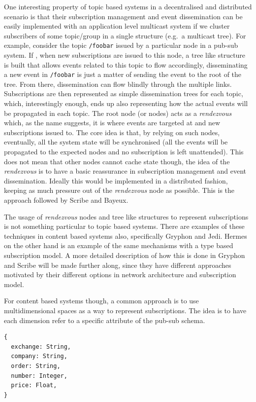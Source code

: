One interesting property of topic based systems in a decentralised and
distributed scenario is that their subscription management and event
dissemination can be easily implemented with an application level
multicast system if we cluster subscribers of some topic/group in a
single structure (e.g.~a multicast tree). For example, consider the
topic \texttt{/foobar} issued by a particular node in a pub-sub system.
If , when new subscriptions are issued to this node, a tree like
structure is built that allows events related to this topic to flow
accordingly, disseminating a new event in \texttt{/foobar} is just a
matter of sending the event to the root of the tree. From there,
dissemination can flow blindly through the multiple links. Subscriptions
are then represented as simple dissemination trees for each topic,
which, interestingly enough, ends up also representing how the actual
events will be propagated in each topic. The root node (or nodes) acts
as a \emph{rendezvous} which, as the name suggests, it is where events
are targeted at and new subscriptions issued to. The core idea is that,
by relying on such nodes, eventually, all the system state will be
synchronised (all the events will be propagated to the expected nodes
and no subscription is left unattended). This does not mean that other
nodes cannot cache state though, the idea of the \emph{rendezvous} is to
have a basic reassurance in subscription management and event
dissemination. Ideally this would be implemented in a distributed
fashion, keeping as much pressure out of the \emph{rendezvous} node as
possible. This is the approach followed by Scribe and Bayeux.

The usage of \emph{rendezvous} nodes and tree like structures to
represent subscriptions is not something particular to topic based
systems. There are examples of these techniques in content based systems
also, specifically Gryphon and Jedi. Hermes on the other hand is
an example of the same mechanisms with a type based subscription model.
A more detailed description of how this is done in Gryphon and Scribe
will be made further along, since they have different approaches
motivated by their different options in network architecture and
subscription model.

For content based systems though, a common approach is to use
multidimensional spaces as a way to represent subscriptions. The idea is
to have each dimension refer to a specific attribute of the pub-sub
schema.

\begin{verbatim}
{
  exchange: String,
  company: String,
  order: String,
  number: Integer,
  price: Float,
}
\end{verbatim}

